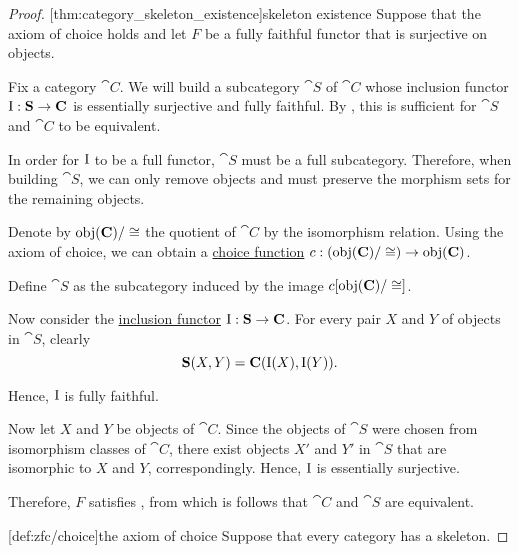 \begin{proof}
  [thm:category_skeleton_existence]{skeleton existence} Suppose that the axiom of choice holds and let \( F \) be a fully faithful functor that is surjective on objects.

  Fix a category \( \cat{C} \). We will build a subcategory \( \cat{S} \) of \( \cat{C} \) whose inclusion functor \( \operatorname{I}: \operatorname{\mathbf{S}} \to \operatorname{\mathbf{C}} \) is essentially surjective and fully faithful. By , this is sufficient for \( \cat{S} \) and \( \cat{C} \) to be equivalent.

  In order for \( \operatorname{I} \) to be a full functor, \( \cat{S} \) must be a full subcategory. Therefore, when building \( \cat{S} \), we can only remove objects and must preserve the morphism sets for the remaining objects.

  Denote by \( \operatorname{obj}(\operatorname{\mathbf{C}}) / \cong \) the quotient of \( \cat{C} \) by the isomorphism relation. Using the axiom of choice, we can obtain a \hyperref[def:choice_function]{choice function} \( c: (\operatorname{obj}(\operatorname{\mathbf{C}}) / \cong) \to \operatorname{obj}(\operatorname{\mathbf{C}}) \).

  Define \( \cat{S} \) as the subcategory induced by the image \( c[\operatorname{obj}(\operatorname{\mathbf{C}}) / \cong] \).

  Now consider the \hyperref[def:subcategory]{inclusion functor} \( \operatorname{I}: \operatorname{\mathbf{S}} \to \operatorname{\mathbf{C}} \). For every pair \( X \) and \( Y \) of objects in \( \cat{S} \), clearly
  \begin{equation*}
    \operatorname{\mathbf{S}}(X, Y) = \operatorname{\mathbf{C}}(\operatorname{I}(X), \operatorname{I}(Y)).
  \end{equation*}

  Hence, \( \operatorname{I} \) is fully faithful.

  Now let \( X \) and \( Y \) be objects of \( \cat{C} \). Since the objects of \( \cat{S} \) were chosen from isomorphism classes of \( \cat{C} \), there exist objects \( X' \) and \( Y' \) in \( \cat{S} \) that are isomorphic to \( X \) and \( Y \), correspondingly. Hence, \( \operatorname{I} \) is essentially surjective.

  Therefore, \( F \) satisfies , from which is follows that \( \cat{C} \) and \( \cat{S} \) are equivalent.

  [def:zfc/choice]{the axiom of choice} Suppose that every category has a skeleton.


\end{proof}
